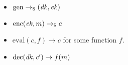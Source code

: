 \begin{itemize}
    \item $\mathrm{gen}\to_\$(\mathit{dk}, \mathit{ek})$
    \item $\mathrm{enc}(\mathit{ek}, m)\to_\$ c$
    \item $\mathrm{eval}(c, f)\to c$ for some function $f$.
    \item $\mathrm{dec}(\mathit{dk}, c')\to f(m)$
\end{itemize}